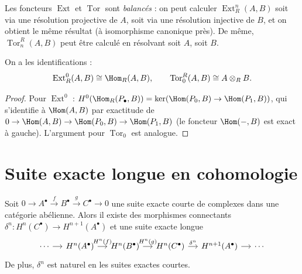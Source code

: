 \begin{remarque}\label{rem:ext-tor-balanced}
Les foncteurs $\operatorname{Ext}$ et $\operatorname{Tor}$ sont
\emph{balancés} : on peut calculer $\operatorname{Ext}_R^n(A, B)$
soit via une résolution projective de $A$, soit via une résolution
injective de $B$, et on obtient le même résultat (à isomorphisme
canonique près). De même, $\operatorname{Tor}_n^R(A, B)$ peut être
calculé en résolvant soit $A$, soit $B$.
\end{remarque}

\begin{proposition}\label{prop:ext0-tor0}
On a les identifications :
\[
  \operatorname{Ext}_R^0(A, B) \cong \Hom_R(A, B), \qquad
  \operatorname{Tor}_0^R(A, B) \cong A \otimes_R B.
\]
\end{proposition}

\begin{proof}
Pour $\operatorname{Ext}^0$ : $H^0(\Hom_R(P_\bullet, B))
= \ker(\Hom(P_0, B) \to \Hom(P_1, B))$, qui s'identifie
à $\Hom(A, B)$ par exactitude de
$0 \to \Hom(A, B) \to \Hom(P_0, B) \to \Hom(P_1, B)$
(le foncteur $\Hom(-, B)$ est exact à gauche).
L'argument pour $\operatorname{Tor}_0$ est analogue.
\end{proof}


\section{Suite exacte longue en cohomologie}\label{sec:long-exact}

\begin{theoreme}\label{thm:long-exact-sequence}
Soit $0 \to A^\bullet \xrightarrow{f} B^\bullet \xrightarrow{g} C^\bullet \to 0$
une suite exacte courte de complexes dans une catégorie abélienne. Alors
il existe des morphismes connectants
$\delta^n \colon H^n(C^\bullet) \to H^{n+1}(A^\bullet)$ et une suite
exacte longue
\[
\begin{tikzcd}[column sep=small]
\cdots \arrow[r]
& H^n(A^\bullet) \arrow[r, "H^n(f)"]
& H^n(B^\bullet) \arrow[r, "H^n(g)"]
& H^n(C^\bullet) \arrow[r, "\delta^n"]
& H^{n+1}(A^\bullet) \arrow[r]
& \cdots
\end{tikzcd}
\]
De plus, $\delta^n$ est naturel en les suites exactes courtes.
\end{theoreme}


